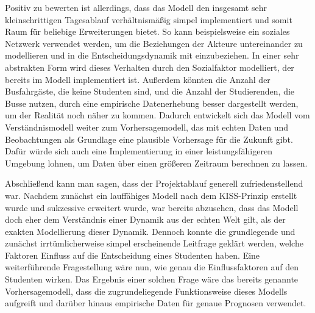 \documentclass[12pt,a4paper]{scrartcl}
\begin{document}
Positiv zu bewerten ist allerdings, dass das Modell den insgesamt sehr kleinschrittigen Tagesablauf verhältnismäßig simpel implementiert und somit Raum für beliebige Erweiterungen bietet. So kann beispielsweise ein soziales Netzwerk verwendet werden, um die Beziehungen der Akteure untereinander zu modellieren und in die Entscheidungsdynamik mit einzubeziehen. In einer sehr abstrakten Form wird dieses Verhalten durch den Sozialfaktor modelliert, der bereits im Modell implementiert ist. Außerdem könnten die Anzahl der Busfahrgäste, die keine Studenten sind, und die Anzahl der Studierenden, die Busse nutzen, durch eine empirische Datenerhebung besser dargestellt werden, um der Realität noch näher zu kommen. Dadurch entwickelt sich das Modell vom Verständnismodell weiter zum Vorhersagemodell, das mit echten Daten und Beobachtungen als Grundlage eine plausible Vorhersage für die Zukunft gibt. Dafür würde sich auch eine Implementierung in einer leistungsfähigeren Umgebung lohnen, um Daten über einen größeren Zeitraum berechnen zu lassen. 

Abschließend kann man sagen, dass der Projektablauf generell zufriedenstellend war. Nachdem zunächst ein lauffähiges Modell nach dem KISS-Prinzip erstellt wurde und sukzessive erweitert wurde, war bereits abzusehen, dass das Modell doch eher dem Verständnis einer Dynamik aus der echten Welt gilt, als der exakten Modellierung dieser Dynamik. Dennoch konnte die grundlegende und zunächst irrtümlicherweise simpel erscheinende Leitfrage geklärt werden, welche Faktoren Einfluss auf die Entscheidung eines Studenten haben. 
Eine weiterführende Fragestellung wäre nun, wie genau die Einflussfaktoren auf den Studenten wirken. Das Ergebnis einer solchen Frage wäre das bereits genannte Vorhersagemodell, dass die zugrundeliegende Funktionsweise dieses Modells aufgreift und darüber hinaus empirische Daten für genaue Prognosen verwendet.
\end{document}
